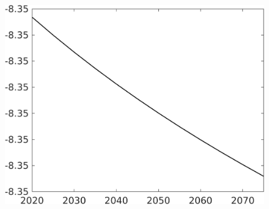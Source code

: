 \begin{figure}[h!!]
\begin{minipage}[]{0.32\textwidth}
		\includegraphics[width=1\textwidth]{../../codding_model/own_basedOnFried/optimalPol_010922_revision/figures/all_13Sept22/CompTaufPER_bytaul_Reg0_N_spillover0_nsk0_xgr0_knspil0_sep0_LFlimit0_emsbase0_countec0_GovRev0_etaa0.79_lgd0.png}
	\end{minipage}
\end{figure}


\clearpage
